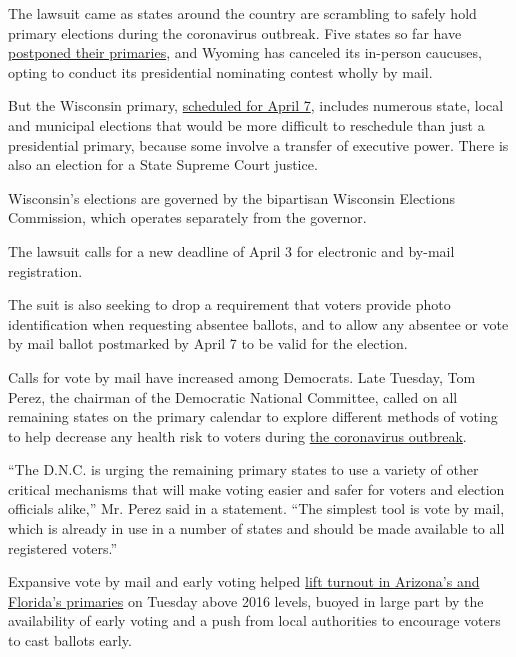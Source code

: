 The lawsuit came as states around the country are scrambling to safely
hold primary elections during the coronavirus outbreak. Five states so
far have
\href{https://www.nytimes3xbfgragh.onion/article/2020-campaign-primary-calendar-coronavirus.html}{postponed
their primaries}, and Wyoming has canceled its in-person caucuses,
opting to conduct its presidential nominating contest wholly by mail.

But the Wisconsin primary,
\href{https://www.nytimes3xbfgragh.onion/interactive/2019/us/elections/2020-presidential-election-calendar.html}{scheduled
for April 7}, includes numerous state, local and municipal elections
that would be more difficult to reschedule than just a presidential
primary, because some involve a transfer of executive power. There is
also an election for a State Supreme Court justice.

Wisconsin's elections are governed by the bipartisan Wisconsin Elections
Commission, which operates separately from the governor.

The lawsuit calls for a new deadline of April 3 for electronic and
by-mail registration.

The suit is also seeking to drop a requirement that voters provide photo
identification when requesting absentee ballots, and to allow any
absentee or vote by mail ballot postmarked by April 7 to be valid for
the election.

Calls for vote by mail have increased among Democrats. Late Tuesday, Tom
Perez, the chairman of the Democratic National Committee, called on all
remaining states on the primary calendar to explore different methods of
voting to help decrease any health risk to voters during
\href{https://www.nytimes3xbfgragh.onion/2020/03/18/world/coronavirus-news.html}{the
coronavirus outbreak}.

``The D.N.C. is urging the remaining primary states to use a variety of
other critical mechanisms that will make voting easier and safer for
voters and election officials alike,'' Mr. Perez said in a statement.
``The simplest tool is vote by mail, which is already in use in a number
of states and should be made available to all registered voters.''

Expansive vote by mail and early voting helped
\href{https://www.nytimes3xbfgragh.onion/2020/03/17/us/politics/march-17-democratic-primary.html}{lift
turnout in Arizona's and Florida's primaries} on Tuesday above 2016
levels, buoyed in large part by the availability of early voting and a
push from local authorities to encourage voters to cast ballots early.

